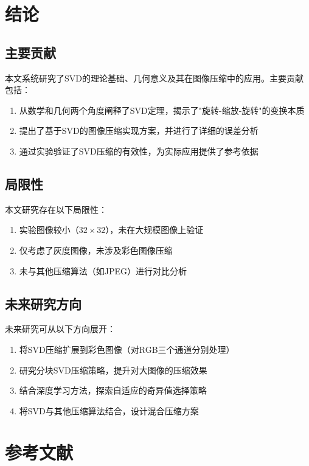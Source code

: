 \documentclass[12pt,a4paper]{article}
\begin{document}
\section{结论}

\subsection{主要贡献}

本文系统研究了SVD的理论基础、几何意义及其在图像压缩中的应用。主要贡献包括：

\begin{enumerate}
    \item 从数学和几何两个角度阐释了SVD定理，揭示了"旋转-缩放-旋转"的变换本质
    \item 提出了基于SVD的图像压缩实现方案，并进行了详细的误差分析
    \item 通过实验验证了SVD压缩的有效性，为实际应用提供了参考依据
\end{enumerate}

\subsection{局限性}

本文研究存在以下局限性：

\begin{enumerate}
    \item 实验图像较小（$32 \times 32$），未在大规模图像上验证
    \item 仅考虑了灰度图像，未涉及彩色图像压缩
    \item 未与其他压缩算法（如JPEG）进行对比分析
\end{enumerate}

\subsection{未来研究方向}

未来研究可从以下方向展开：

\begin{enumerate}
    \item 将SVD压缩扩展到彩色图像（对RGB三个通道分别处理）
    \item 研究分块SVD压缩策略，提升对大图像的压缩效果
    \item 结合深度学习方法，探索自适应的奇异值选择策略
    \item 将SVD与其他压缩算法结合，设计混合压缩方案
\end{enumerate}

\section*{参考文献}
\end{document}
